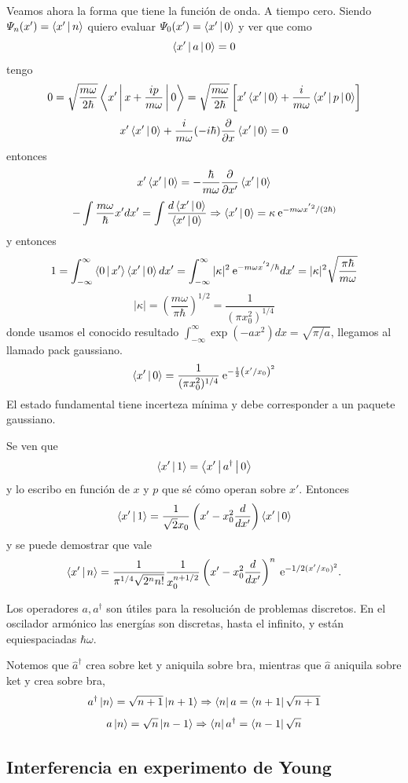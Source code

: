 \documentclass[10pt,oneside]{CBFT_book}
\begin{document}
Veamos ahora la forma que tiene la función de onda. A tiempo cero.
Siendo $\Psi_n(x') = \Braket{x'|n}$ quiero evaluar $\Psi_0(x') = \Braket{x'|0}$ y ver que como 
\[
	\Braket{x'|a|0}= 0 
\]
tengo 
\[
	0 = \sqrt{ \frac{m\omega}{2\hbar} } \Braket{x'|x+\frac{ip}{m\omega}|0} =
	\sqrt{ \frac{m\omega}{2\hbar} } \left[ x'\Braket{x'|0} + \frac{i}{m\omega}\Braket{x'|p|0} \right]
\]
\[
	x' \Braket{x'|0} + \frac{i}{m\omega} (-i\hbar) \frac{\partial^{\hspace{-0.05em}} {}}{\partial {x}^{\hspace{-0.05em}}} \Braket{x'|0} = 0
\]
entonces 
\[
	x' \Braket{x'|0} = - \frac{\hbar}{m\omega} \frac{\partial^{\hspace{-0.05em}} {}}{\partial {x'}^{\hspace{-0.05em}}}\Braket{x'|0} 
\]
\[
	- \int \frac{m\omega}{\hbar} x' dx' = \int \frac{d \Braket{x'|0}}{\Braket{x'|0}} \Rightarrow 
	\Braket{x'|0} = \kappa \:\mathrm{e}^{-m\omega x^{'2}/(2\hbar)}
\]
y entonces 
\[
	1 = \int_{-\infty}^{\infty} \Braket{0|x'}\Braket{x'|0} dx' = 
	\int_{-\infty}^{\infty} |\kappa|^2 \:\mathrm{e}^{-m\omega x^{'2}/\hbar} dx' =
	|\kappa|^2 \sqrt{\frac{\pi\hbar}{m\omega}} 
\]
\[
	|\kappa| = \left( \frac{m\omega}{\pi\hbar} \right)^{1/2} = \frac{1}{(\pi x_0^2)^{1/4}}
\]
donde usamos el conocido resultado $\int_{-\infty}^\infty \exp( - a x^2) dx = \sqrt{\pi/a}$, llegamos al 
llamado pack 
gaussiano.
\[
	\Braket{x'|0} = \frac{1}{(\pi x_0^2)^{1/4}} \:\mathrm{e}^{-\frac{1}{2}\left( x'/x_0 \right)^2}
\]
El estado fundamental tiene incerteza mínima y debe corresponder a un paquete gaussiano.

Se ven que 
\[
	\Braket{x'|1} = \Braket{x'|a^\dagger|0}
\]
y lo escribo en función de $x$ y $p$ que sé cómo operan sobre $x'$. Entonces
\[
	\Braket{x'|1} = \frac{1}{\sqrt{2}x_0} \left( x' - x_0^2 \frac{d^{\hspace{-0.05em}} {}}{d {x'}^{\hspace{-0.05em}}} \right) \Braket{x'|0}
\]
y se puede demostrar que vale
\[
	\Braket{x'|n} = \frac{1}{\pi^{1/4} \sqrt{2^n n!}} \frac{1}{x_0^{n+1/2}} 
	\left( x' - x_0^2 \frac{d^{\hspace{-0.05em}} {}}{d {x'}^{\hspace{-0.05em}}} \right)^n \:\mathrm{e}^{-1/2 (x'/x_0)^2}.
\]

Los operadores $a,a^\dagger$ son útiles para la resolución de problemas discretos.
En el oscilador armónico las energías son discretas, hasta el infinito, y están
equiespaciadas $\hbar \omega$.

Notemos que $\hat{a}^\dagger$ crea sobre ket y aniquila sobre bra, mientras que $\hat{a}$ aniquila 
sobre ket y crea sobre bra,
\[
	a^\dagger \Ket{n} = \sqrt{n+1} \Ket{n+1} \Rightarrow \Bra{n} a = \Bra{n+1} \sqrt{n+1}
\]
\[
	a \Ket{n} = \sqrt{n} \Ket{n-1} \Rightarrow \Bra{n} a^\dagger = \Bra{n-1} \sqrt{n}
\]

\subsection{Interferencia en experimento de Young}
\end{document}
